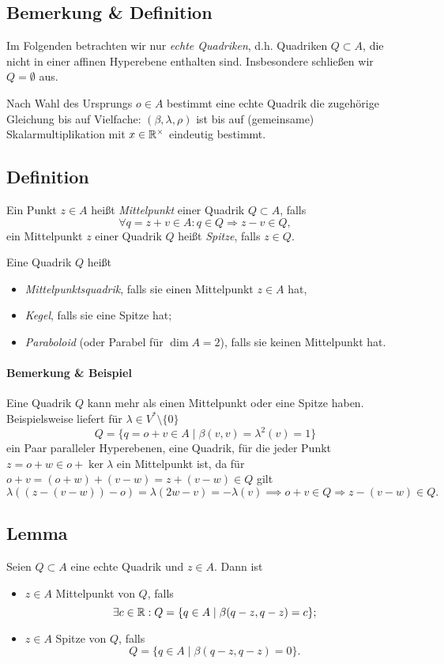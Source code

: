 \subsection{Bemerkung \& Definition}
	Im Folgenden betrachten wir nur \emph{echte Quadriken}, d.h. Quadriken $ Q\subset A $, die nicht in einer affinen Hyperebene enthalten sind.
	Insbesondere schließen wir $ Q=\emptyset $ aus. 
	
	Nach Wahl des Ursprungs $ o\in A $ bestimmt eine echte Quadrik die zugehörige Gleichung bis auf Vielfache: $ (\beta,\lambda,\rho) $ ist bis auf (gemeinsame) Skalarmultiplikation mit $ x\in\mathbb{R}^\times  $ eindeutig bestimmt.
\subsection{Definition}
	Ein Punkt $ z\in A $ heißt \emph{Mittelpunkt} einer Quadrik $ Q\subset A $, falls
		\[ \forall q=z+v\in A: q\in Q\Rightarrow z-v\in Q, \]
	ein Mittelpunkt $ z $ einer Quadrik $ Q $ heißt \emph{Spitze}, falls $ z\in Q $.
	
	Eine Quadrik $ Q $ heißt
	\begin{itemize}
		\item \emph{Mittelpunktsquadrik}, falls sie einen Mittelpunkt $ z\in A $ hat,
		\item \emph{Kegel}, falls sie eine Spitze hat; 
		\item \emph{Paraboloid} (oder Parabel für $ \dim A = 2 $), falls sie keinen Mittelpunkt hat.
	\end{itemize}
\paragraph{Bemerkung \& Beispiel}
	Eine Quadrik $ Q $ kann mehr als einen Mittelpunkt oder eine Spitze haben.
	Beispielsweise liefert für $ \lambda\in V^*\setminus\{0\} $
		\[ Q = \{q=o+v\in A\mid \beta(v,v) = \lambda^2(v) = 1\} \]
	ein Paar paralleler Hyperebenen, eine Quadrik, für die jeder Punkt $ z = o+w \in o+\ker \lambda $ ein Mittelpunkt ist, da für $ o+v = (o+w)+(v-w) = z+(v-w)\in Q $ gilt
		\[ \lambda\left((z-(v-w))-o\right) = \lambda(2w-v) = -\lambda(v)\implies o+v\in Q\Rightarrow z-(v-w)\in Q. \]
\subsection{Lemma}
	Seien $ Q\subset A $ eine echte Quadrik und $ z\in A $. Dann ist
	\begin{itemize}
		\item $ z\in A $ Mittelpunkt von $ Q $, falls
			\[ \exists c\in \mathbb{R}: Q=\{q\in A\mid \beta(q-z,q-z)=c \}; \]
		\item $ z\in A $ Spitze von $ Q $, falls
			\[ Q=\{q\in A\mid \beta(q-z,q-z) = 0\}. \]
	\end{itemize}
